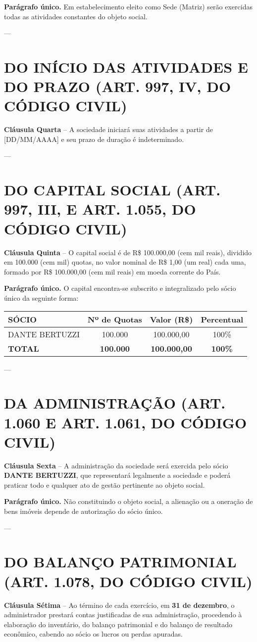 \documentclass[12pt,a4paper]{article}
\newcommand{\secao}[1]{\section*{{\large\textbf{#1}}}}
\begin{document}
\noindent\textbf{Parágrafo único.} Em estabelecimento eleito como Sede (Matriz) serão exercidas todas as atividades constantes do objeto social.

---
\secao{DO INÍCIO DAS ATIVIDADES E DO PRAZO (ART. 997, IV, DO CÓDIGO CIVIL)}

\noindent\textbf{Cláusula Quarta} -- A sociedade iniciará suas atividades a partir de [DD/MM/AAAA] e seu prazo de duração é indeterminado.

---
\secao{DO CAPITAL SOCIAL (ART. 997, III, E ART. 1.055, DO CÓDIGO CIVIL)}

\noindent\textbf{Cláusula Quinta} -- O capital social é de R\$ 100.000,00 (cem mil reais), dividido em 100.000 (cem mil) quotas, no valor nominal de R\$ 1,00 (um real) cada uma, formado por R\$ 100.000,00 (cem mil reais) em moeda corrente do País.

\noindent\textbf{Parágrafo único.} O capital encontra-se subscrito e integralizado pelo sócio único da seguinte forma:

\vspace{0.3cm}

\begin{center}
\begin{tabular}{lccc}
\toprule
\textbf{SÓCIO} & \textbf{Nº de Quotas} & \textbf{Valor (R\$)} & \textbf{Percentual} \\
\midrule
DANTE BERTUZZI & 100.000 & 100.000,00 & 100\% \\
\midrule
\textbf{TOTAL} & \textbf{100.000} & \textbf{100.000,00} & \textbf{100\%} \\
\bottomrule
\end{tabular}
\end{center}

\vspace{0.3cm}

---
\secao{DA ADMINISTRAÇÃO (ART. 1.060 E ART. 1.061, DO CÓDIGO CIVIL)}

\noindent\textbf{Cláusula Sexta} -- A administração da sociedade será exercida pelo sócio \textbf{DANTE BERTUZZI}, que representará legalmente a sociedade e poderá praticar todo e qualquer ato de gestão pertinente ao objeto social.

\noindent\textbf{Parágrafo único.} Não constituindo o objeto social, a alienação ou a oneração de bens imóveis depende de autorização do sócio único.

---
\secao{DO BALANÇO PATRIMONIAL (ART. 1.078, DO CÓDIGO CIVIL)}

\noindent\textbf{Cláusula Sétima} -- Ao término de cada exercício, em \textbf{31 de dezembro}, o administrador prestará contas justificadas de sua administração, procedendo à elaboração do inventário, do balanço patrimonial e do balanço de resultado econômico, cabendo ao sócio os lucros ou perdas apuradas.
\end{document}

